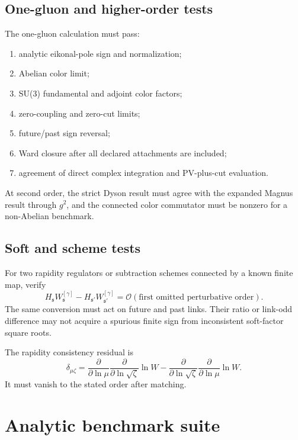 \documentclass[11pt]{article}
\newcommand{\cO}{\mathcal O}
\begin{document}
\subsection{One-gluon and higher-order tests}

The one-gluon calculation must pass:
\begin{enumerate}
\item analytic eikonal-pole sign and normalization;
\item Abelian color limit;
\item SU(3) fundamental and adjoint color factors;
\item zero-coupling and zero-cut limits;
\item future/past sign reversal;
\item Ward closure after all declared attachments are included;
\item agreement of direct complex integration and PV-plus-cut evaluation.
\end{enumerate}
At second order, the strict Dyson result must agree with the expanded Magnus
result through \(g^2\), and the connected color commutator must be nonzero for
a non-Abelian benchmark.

\subsection{Soft and scheme tests}

For two rapidity regulators or subtraction schemes connected by a known
finite map, verify
\begin{equation}
 H_{\mathfrak s}W_{\mathfrak s}^{[\gamma]}
 -H_{\mathfrak s'}W_{\mathfrak s'}^{[\gamma]}
 =\cO(\text{first omitted perturbative order}).
\label{eq:scheme-invariance-test}
\end{equation}
The same conversion must act on future and past links.  Their ratio or
link-odd difference may not acquire a spurious finite sign from inconsistent
soft-factor square roots.

The rapidity consistency residual is
\begin{equation}
 \delta_{\mu\zeta}
 =
 \frac{\partial}{\partial\ln\mu}
 \frac{\partial}{\partial\ln\sqrt\zeta}
 \ln W
 -
 \frac{\partial}{\partial\ln\sqrt\zeta}
 \frac{\partial}{\partial\ln\mu}
 \ln W.
\label{eq:rapidity-integrability-residual}
\end{equation}
It must vanish to the stated order after matching.

\section{Analytic benchmark suite}
\label{sec:benchmarks}
\end{document}
